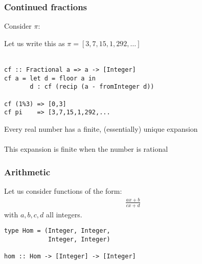 \documentclass[11pt]{beamer}
\begin{document}
\begin{frame}
\frametitle{Continued fractions}
Consider $\pi$:
\end{frame}

\begin{frame}[fragile]
Let us write this as $\pi = [3,7,15,1,292,\dots]$
\\~\\ \pause
\begin{verbatim}
cf :: Fractional a => a -> [Integer]
cf a = let d = floor a in
       d : cf (recip (a - fromInteger d))

cf (1%3) => [0,3]
cf pi    => [3,7,15,1,292,...
\end{verbatim}
\pause
Every real number has a finite, (essentially) unique expansion
\\~\\ \pause
This expansion is finite when the number is rational
\end{frame}

\begin{frame}[fragile]
\frametitle{Arithmetic}
Let us consider functions of the form:
\begin{align*}
\frac{ax + b}{cx + d}
\end{align*}
with $a,b,c,d$ all integers.
\pause
\begin{verbatim}
type Hom = (Integer, Integer,
            Integer, Integer)

hom :: Hom -> [Integer] -> [Integer]
\end{verbatim}
\end{frame}
\end{document}
